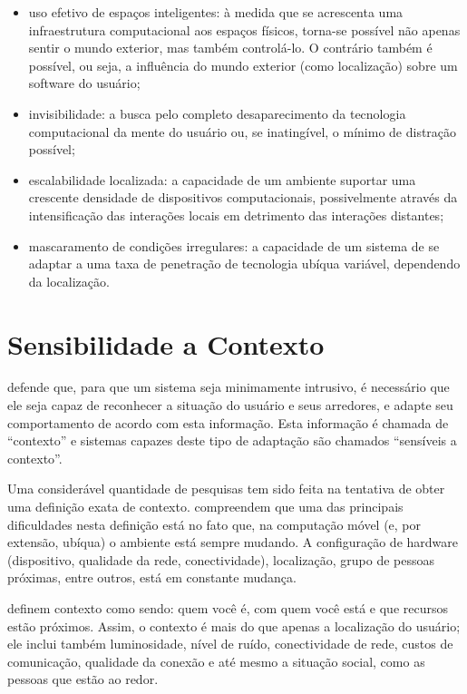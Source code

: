 \begin{itemize}
  \item uso efetivo de espaços inteligentes: à medida que se acrescenta uma infraestrutura computacional aos espaços físicos, torna-se possível não apenas sentir o mundo exterior, mas também controlá-lo. O contrário também é possível, ou seja, a influência do mundo exterior (como localização) sobre um software do usuário;

  \item invisibilidade: a busca pelo completo desaparecimento da tecnologia computacional da mente do usuário ou, se inatingível, o mínimo de distração possível;

  \item escalabilidade localizada: a capacidade de um ambiente suportar uma crescente densidade de dispositivos computacionais, possivelmente através da intensificação das interações locais em detrimento das interações distantes;

  \item mascaramento de condições irregulares: a capacidade de um sistema de se adaptar a uma taxa de penetração de tecnologia ubíqua variável, dependendo da localização.
\end{itemize}


\section{Sensibilidade a Contexto}
\label{sec:contexto}

 defende que, para que um sistema seja minimamente intrusivo, é necessário que ele seja capaz de reconhecer a situação do usuário e seus arredores, e adapte seu comportamento de acordo com esta informação. Esta informação é chamada de ``contexto'' e sistemas capazes deste tipo de adaptação são chamados ``sensíveis a contexto''.

Uma considerável quantidade de pesquisas tem sido feita na tentativa de obter uma definição exata de contexto.  compreendem que uma das principais dificuldades nesta definição está no fato que, na computação móvel (e, por extensão, ubíqua) o ambiente está sempre mudando. A configuração de hardware (dispositivo, qualidade da rede, conectividade), localização, grupo de pessoas próximas, entre outros, está em constante mudança.

 definem contexto como sendo: quem você é, com quem você está e que recursos estão próximos. Assim, o contexto é mais do que apenas a localização do usuário; ele inclui também luminosidade, nível de ruído, conectividade de rede, custos de comunicação, qualidade da conexão e até mesmo a situação social, como as pessoas que estão ao redor.

